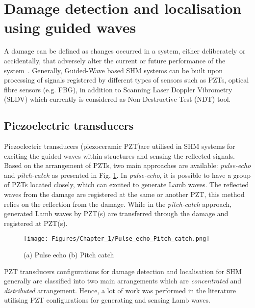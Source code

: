 \section[Damage identification]{Damage detection and localisation using guided waves}
\label{sec23}

A damage can be defined as changes occurred in a system, either deliberately or accidentally, that adversely alter the current or future performance of the system~\cite{Farrar2012}. 
Generally, Guided-Wave based SHM systems can be built upon processing of signals registered by different types of sensors such as PZTs, optical fibre sensors (e.g. FBG), in addition to Scanning Laser Doppler Vibrometry (SLDV) which currently is considered as Non-Destructive Test (NDT) tool.
\subsection{Piezoelectric transducers} 
Piezoelectric transducers (piezoceramic PZT)are utilised in SHM systems for exciting the guided waves within structures and sensing the reflected signals. 
Based on the arrangement of PZTs, two main approaches are available: \emph{pulse-echo} and \emph{pitch-catch} as presented in Fig. \ref{fig:Pulse_echo_Pitch_catch}.
In \emph{pulse-echo}, it is possible to have a group of PZTs located closely, which can excited to generate Lamb waves. 
The reflected waves from the damage are registered at the same or another PZT, this method relies on the reflection from the damage. 
While in the \emph{pitch-catch} approach, generated Lamb waves by PZT(s) are transferred through the damage and registered at PZT(s).
\begin{figure}[!ht]
	\begin{center}
		\centering
		\texttt{[image: Figures/Chapter\_1/Pulse\_echo\_Pitch\_catch.png]}
	\end{center}
	\caption{(a) Pulse echo	(b) Pitch catch} 
	\label{fig:Pulse_echo_Pitch_catch}
\end{figure}
PZT transducers configurations for damage detection and localisation for SHM generally are classified into two main arrangements which are \emph{concentrated} and \emph{distributed} arrangement. 
Hence, a lot of work was performed in the literature utilising PZT configurations for generating and sensing  Lamb waves.

